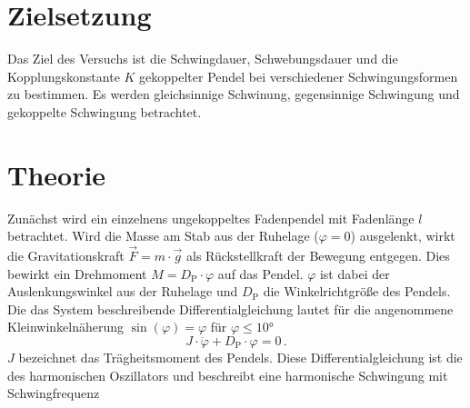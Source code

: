 \section{Zielsetzung}
\label{sec:Zielsetzung}
Das Ziel des Versuchs ist die Schwingdauer, Schwebungsdauer und die Kopplungskonstante $K$ gekoppelter Pendel bei verschiedener Schwingungsformen zu bestimmen. 
Es werden gleichsinnige Schwinung, gegensinnige Schwingung und gekoppelte Schwingung betrachtet.  

\section{Theorie}
\label{sec:Theorie}
Zunächst wird ein einzelnens ungekoppeltes Fadenpendel mit Fadenlänge $l$ betrachtet. 
Wird die Masse am Stab aus der Ruhelage ($\varphi = 0$) ausgelenkt, wirkt 
die Gravitationskraft $\vec{F} = m \cdot \vec{g}$ als Rückstellkraft der Bewegung entgegen. Dies bewirkt ein Drehmoment 
$M = D_{\text{P}} \cdot \varphi$ auf das Pendel. $\varphi$ ist dabei der Auslenkungswinkel aus der Ruhelage und $D_{\text{P}}$ die 
Winkelrichtgröße des Pendels. Die das System beschreibende Differentialgleichung lautet für die angenommene Kleinwinkelnäherung 
$\sin(\varphi) = \varphi$ für $\varphi \leq 10°$
\begin{equation*}
    J \cdot \ddot{\varphi} + D_{\text{P}} \cdot \varphi = 0\,.
\end{equation*}
$J$ bezeichnet das Trägheitsmoment des Pendels. Diese Differentialgleichung ist die des harmonischen Oszillators und beschreibt eine harmonische Schwingung 
mit Schwingfrequenz 

